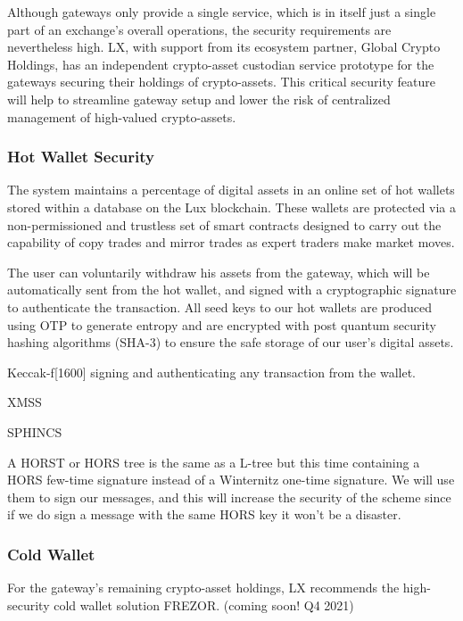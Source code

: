 \documentclass[11pt]{article}
\begin{document}
Although gateways only provide a single service, which is in itself just a single part of an exchange's overall operations, the security requirements are nevertheless high. LX, with support from its ecosystem partner, Global Crypto Holdings, has an independent crypto-asset custodian service prototype for the gateways securing their holdings of crypto-assets. This critical security feature will help to streamline gateway setup and lower the risk of centralized management of high-valued crypto-assets.


\subsubsection{Hot Wallet Security}

The system maintains a percentage of digital assets in an online set of hot wallets stored within a database on the Lux  blockchain. These wallets are protected via a non-permissioned and trustless set of smart contracts designed to carry out the capability of copy trades and mirror trades as expert traders make market moves.


The user can voluntarily withdraw his assets from the gateway, which will be automatically sent from the hot wallet, and signed with a cryptographic signature to authenticate the transaction. All seed keys to our hot wallets are produced using OTP to generate entropy and are encrypted with post quantum security hashing algorithms (SHA-3) to ensure the safe storage of our user's digital assets.


Keccak-f[1600] signing and authenticating any transaction from the wallet.


XMSS


SPHINCS


A HORST or HORS tree is the same as a L-tree but this time containing a HORS few-time signature instead of a Winternitz one-time signature. We will use them to sign our messages, and this will increase the security of the scheme since if we do sign a message with the same HORS key it won't be a disaster.


\subsubsection{Cold Wallet}

For the gateway's remaining crypto-asset holdings, LX recommends the high-security cold wallet solution FREZOR. (coming soon! Q4 2021)
\end{document}
